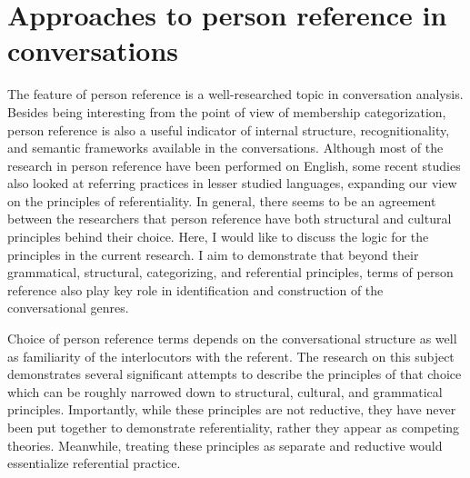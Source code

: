 \documentclass[12pt, draft]{article}
\begin{document}
\section{Approaches to person reference in conversations}
The feature of person reference is a well-researched topic in conversation analysis. Besides being interesting from the point of view of membership categorization, person reference is also a useful indicator of internal structure, recognitionality, and semantic frameworks available in the conversations. Although most of the research in person reference have been performed on English, some recent studies also looked at referring practices in lesser studied languages, expanding our view on the principles of referentiality. In general, there seems to be an agreement between the researchers that person reference have both structural and cultural principles behind their choice. Here, I would like to discuss the logic for the principles in the current research. I aim to demonstrate that beyond their grammatical, structural, categorizing, and referential principles, terms of person reference also play key role in identification and construction of the conversational genres.

Choice of person reference terms depends on the conversational structure as well as familiarity of the interlocutors with the referent. The research on this subject demonstrates several significant attempts to describe the principles of that choice which can be roughly narrowed down to structural, cultural, and grammatical principles. Importantly, while these principles are not reductive, they have never been put together to demonstrate referentiality, rather they appear as competing theories. Meanwhile, treating these principles as separate and reductive would essentialize referential practice. 
\end{document}
